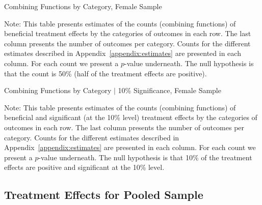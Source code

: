 	\begin{table}[H]
     \caption{Combining Functions by Category, Female Sample} 
     \label{table:abccare_rslt_female_counts_n50a100}
	
	\end{table}
\begin{spacing}{1}
\begin{footnotesize}
\noindent Note: This table presents estimates of the counts (combining functions) of beneficial treatment effects by the categories of outcomes in each row. The last column presents the number of outcomes per category. Counts for the different estimates described in Appendix~\ref{appendix:estimates} are presented in each column. For each count we present a $p$-value underneath. The null hypothesis is that the count is 50\% (half of the treatment effects are positive).
\end{footnotesize}
\end{spacing}   

	\begin{table}[H]
     \caption{Combining Functions by Category $|$ 10\% Significance, Female Sample} 
     \label{table:abccare_rslt_female_counts_n10a10}
	
	\end{table}
\begin{spacing}{1}
\begin{footnotesize}
\noindent Note: This table presents estimates of the counts (combining functions) of beneficial and significant (at the 10\% level) treatment effects by the categories of outcomes in each row. The last column presents the number of outcomes per category. Counts for the different estimates described in Appendix~\ref{appendix:estimates} are presented in each column. For each count we present a $p$-value underneath. The null hypothesis is that 10\% of the treatment effects are positive and significant at the 10\% level.
\end{footnotesize}
\end{spacing}

\clearpage

\subsection{Treatment Effects for Pooled Sample}


